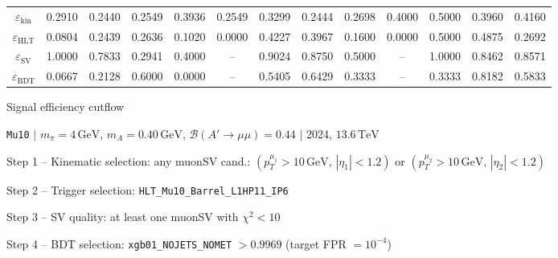 \documentclass[10pt,a4paper]{article}
\begin{document}
\begin{landscape}
{\begin{tabular}{c|cccc|cccc|cccc}
\midrule
$\varepsilon_{\mathrm{kin}}$ & 0.2910 & 0.2440 & 0.2549 & 0.3936 & 0.2549 & 0.3299 & 0.2444 & 0.2698 & 0.4000 & 0.5000 & 0.3960 & 0.4160\\
$\varepsilon_{\mathrm{HLT}}$ & 0.0804 & 0.2439 & 0.2636 & 0.1020 & 0.0000 & 0.4227 & 0.3967 & 0.1600 & 0.0000 & 0.5000 & 0.4875 & 0.2692\\
$\varepsilon_{\mathrm{SV}}$ & 1.0000 & 0.7833 & 0.2941 & 0.4000 & -- & 0.9024 & 0.8750 & 0.5000 & -- & 1.0000 & 0.8462 & 0.8571\\
$\varepsilon_{\mathrm{BDT}}$ & 0.0667 & 0.2128 & 0.6000 & 0.0000 & -- & 0.5405 & 0.6429 & 0.3333 & -- & 0.3333 & 0.8182 & 0.5833\\
\bottomrule
\end{tabular}}

\end{landscape}
\clearpage

{\large Signal efficiency cutflow

 \texttt{Mu10} $|$ $m_{\pi}=4\,\mathrm{GeV}$, $m_{A}=0.40\,\mathrm{GeV}$, $\mathcal{B}(A'\!\to\!\mu\mu)=0.44$ $|$ 2024, $13.6\,\mathrm{TeV}$}

\vspace{0.8em}

Step 1 -- Kinematic selection: any muonSV cand.: $(p_T^{\mu_1}{>}10\,\mathrm{GeV},\,|\eta_1|{<}1.2)$ or $(p_T^{\mu_2}{>}10\,\mathrm{GeV},\,|\eta_2|{<}1.2)$

Step 2 -- Trigger selection: \texttt{HLT\_Mu10\_Barrel\_L1HP11\_IP6}

Step 3 -- SV quality: at least one muonSV with $\chi^2<10$

Step 4 -- BDT selection: \texttt{xgb01\_NOJETS\_NOMET} $>0.9969$ (target FPR $=10^{-4}$)

\vspace{0.8em}
\end{document}
